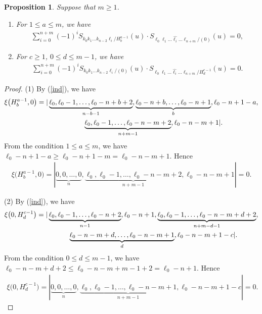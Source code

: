 \documentclass[pdftex]{sigma}
\numberwithin{equation}{section}
\newtheorem{Proposition}[Theorem]{Proposition}
 { \theoremstyle{definition}
\newtheorem{Definition}[Theorem]{Definition}
\newtheorem{Note}[Theorem]{Note}
\newtheorem{Example}[Theorem]{Example}
\newtheorem{Remark}[Theorem]{Remark} }
\begin{document}
\begin{Proposition}\label{00}\samepage
Suppose that $m \geq 1$.
\begin{enumerate}
\item[$(1)$] For $1\leq a\leq m$, we have\
\begin{gather*}
\sum_{i=0}^{n+m}{(-1)}^{i}S_{k_0 k_1\dots k_{n-2}\ell_i/{H^{a-1}_{b}}}(u)\cdot S_{\ell_0 \ell_1\dots \widehat{\ell_{i}}\dots\ell_{n+m}/{(0)}}(u)=0,%
\end{gather*}
\item[$(2)$] For $c\geq 1$, $0\leq d \leq m-1$, we have\
\begin{gather*}
\sum_{i=0}^{n+m}{(-1)}^{i}S_{k_0 k_1\dots k_{n-2}\ell_i/{(0)}}(u)\cdot S_{\ell_0 \ell_1\dots \widehat{\ell_{i}}\dots\ell_{n+m}/{H^{c-1}_{d}}}(u)=0.%
\end{gather*}
\end{enumerate}
\end{Proposition}
\begin{proof}
(1) By (\ref{ind}), we have
\begin{gather*}
\xi\bigl(H^{a-1}_{b},0\bigr)=|\underbrace{\ell_{0},\ell_{0}-1,\dots,\ell_{0}-n+b+2}_{n-b-1},\underbrace{\ell_{0}-n+b,\dots,\ell_{0}-n+1}_{b},\ell_{0}-n+1-a,\nonumber\\
\hphantom{\xi\bigl(H^{a-1}_{b},0\bigr)=|}{}
\underbrace{\ell_{0},\ell_{0}-1,\dots,\ell_{0}-n-m+2}_{n+m-1},\ell_{0}-n-m+1|.\nonumber
\end{gather*}
From the condition $1\leq a\leq m$, we have $\ell_0-n+1-a\geq\ell_{0}-n+1-m=\ell_{0}-n-m+1$. Hence
\begin{gather*}
\xi\bigl(H^{a-1}_{b},0\bigr)=|\underbrace{0,0,\dots,0}_{n},\underbrace{\ell_{0},\ell_{0}-1,\dots,\ell_{0}-n-m+2}_{n+m-1},\ell_{0}-n-m+1|=0.\nonumber
\end{gather*}

(2) By (\ref{ind}), we have
\begin{gather*}
\xi\bigl(0,H^{c-1}_{d}\bigr)=|\underbrace{\ell_{0},\ell_{0}-1,\dots,\ell_{0}-n+2}_{n-1},\ell_{0}-n+1,
\underbrace{\ell_{0},\ell_{0}-1,\dots,\ell_{0}-n-m+d+2}_{n+m-d-1},\nonumber\\
\hphantom{\xi\bigl(0,H^{c-1}_{d}\bigr)=|}{}
\underbrace{\ell_{0}-n-m+d,\dots,\ell_{0}-n-m+1}_{d},\ell_{0}-n-m+1-c|\nonumber.
\end{gather*}
From the condition $0\leq d \leq m-1$, we have $\ell_0-n-m+d+2\leq\ell_{0}-n-m+m-1+2=\ell_{0}-n+1$. Hence
\begin{gather*}
\xi\bigl(0,H^{c-1}_{d}\bigr)=|\underbrace{0,0,\dots,0}_{n},\underbrace{\ell_{0},\ell_{0}-1,\dots,\ell_{0}-n-m+1}_{n+m-1},\ell_{0}-n-m+1-c|=0.
\tag*{\qed}
\end{gather*}
\renewcommand{\qed}{}
\end{proof}
\end{document}
